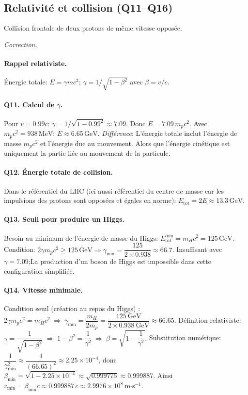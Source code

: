 \documentclass[11pt,a4paper]{article}
\newenvironment{correction}{
    \par\begingroup
    \color{blue!60!black}
    \smallskip\noindent\textit{Correction.}\quad
}{\par\medskip\endgroup}
\begin{document}
\subsection*{Relativité et collision (Q11--Q16)}
Collision frontale de deux protons de même vitesse opposée.
\begin{correction}
\paragraph{Rappel relativiste.} Énergie totale: $E=\gamma mc^{2}$; $\gamma = 1/\sqrt{1-\beta^{2}}$ avec $\beta=v/c$.

\paragraph{Q11. Calcul de $\gamma$.} Pour $v=0.99c$: $\gamma = 1/\sqrt{1-0.99^{2}} \approx 7.09$. Donc $E = 7.09\, m_p c^{2}$. Avec $m_p c^{2} = 938\,\text{MeV}$: $E \approx 6.65\,\text{GeV}$. \emph{Différence}: L'énergie totale inclut l'énergie de masse $m_pc^{2}$ et l'énergie due au mouvement. Alors que l'énergie cinétique est uniquement la partie liée au mouvement de la particule.
\paragraph{Q12. Énergie totale de collision.} Dans le référentiel du LHC (ici aussi référentiel du centre de masse car les impulsions des protons sont opposées et égales en norme): $E_{\text{tot}} = 2E \approx 13.3\,\text{GeV}$.

\paragraph{Q13. Seuil pour produire un Higgs.} Besoin au minimum de l'énergie de masse du Higgs: $E_{\text{tot}}^{\min} = m_H c^{2} = 125\,\text{GeV}$. Condition: $2\gamma m_p c^{2} \ge 125\,\text{GeV} \Rightarrow \gamma_{\min} = \dfrac{125}{2\times 0.938} \approx 66.7$. Insuffisant avec $\gamma=7.09$;La production d'un boson de Higgs est impossible dans cette configuration simplifiée.

\paragraph{Q14. Vitesse minimale.} Condition seuil (création au repos du Higgs) : $2\gamma m_p c^{2} = m_H c^{2} \;\Rightarrow\; \gamma_{\min} = \dfrac{m_H}{2m_p} = \dfrac{125\ \text{GeV}}{2\times 0.938\ \text{GeV}} \approx 66.65.$
Définition relativiste: $\gamma = \dfrac{1}{\sqrt{1-\beta^{2}}} \;\Rightarrow\; 1-\beta^{2} = \dfrac{1}{\gamma^{2}} \;\Rightarrow\; \beta = \sqrt{1-\dfrac{1}{\gamma^{2}}}.$
Substitution numérique: $\dfrac{1}{\gamma_{\min}^{2}} \approx \dfrac{1}{(66.65)^{2}} \approx 2.25\times10^{-4}$,
donc $\beta_{\min} = \sqrt{1-2.25\times10^{-4}} \approx \sqrt{0.999775} \approx 0.999887.$
Ainsi $v_{\min} = \beta_{\min} c \approx 0.999887\,c \approx 2.9976\times10^{8}\ \text{m·s}^{-1}$. %


\end{correction}
\end{document}
